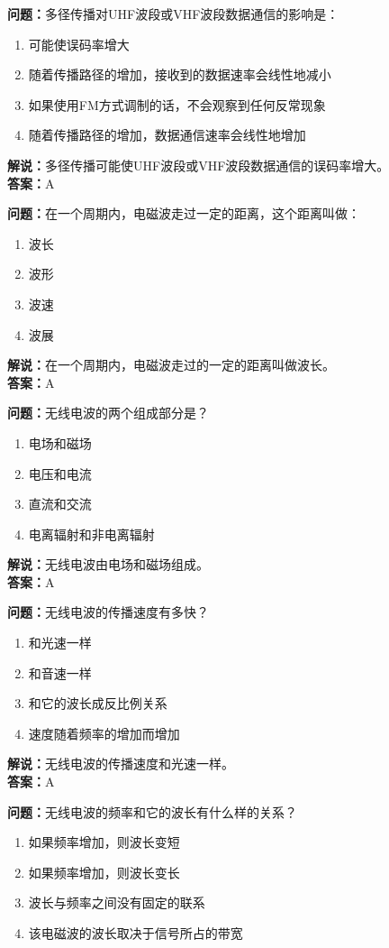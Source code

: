 \documentclass{ctexbook}%
\begin{document}
\textbf{问题：}多径传播对UHF波段或VHF波段数据通信的影响是：
\begin{enumerate}[label=\Alph*), leftmargin=3em]
\item 可能使误码率增大
\item 随着传播路径的增加，接收到的数据速率会线性地减小
\item 如果使用FM方式调制的话，不会观察到任何反常现象
\item 随着传播路径的增加，数据通信速率会线性地增加
\end{enumerate}
\textbf{解说：}多径传播可能使UHF波段或VHF波段数据通信的误码率增大。\\
\textbf{答案：}A

\textbf{问题：}在一个周期内，电磁波走过一定的距离，这个距离叫做：
\begin{enumerate}[label=\Alph*), leftmargin=3em]
\item 波长
\item 波形
\item 波速
\item 波展
\end{enumerate}
\textbf{解说：}在一个周期内，电磁波走过的一定的距离叫做波长。\\
\textbf{答案：}A

\textbf{问题：}无线电波的两个组成部分是？
\begin{enumerate}[label=\Alph*), leftmargin=3em]
\item 电场和磁场
\item 电压和电流
\item 直流和交流
\item 电离辐射和非电离辐射
\end{enumerate}
\textbf{解说：}无线电波由电场和磁场组成。\\
\textbf{答案：}A

\textbf{问题：}无线电波的传播速度有多快？
\begin{enumerate}[label=\Alph*), leftmargin=3em]
\item 和光速一样
\item 和音速一样
\item 和它的波长成反比例关系
\item 速度随着频率的增加而增加
\end{enumerate}
\textbf{解说：}无线电波的传播速度和光速一样。\\
\textbf{答案：}A

\textbf{问题：}无线电波的频率和它的波长有什么样的关系？
\begin{enumerate}[label=\Alph*), leftmargin=3em]
\item 如果频率增加，则波长变短
\item 如果频率增加，则波长变长
\item 波长与频率之间没有固定的联系
\item 该电磁波的波长取决于信号所占的带宽
\end{enumerate}
\end{document}
